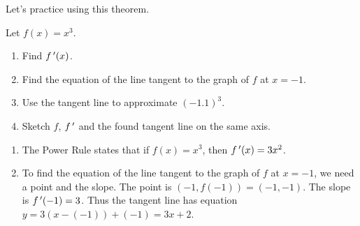 
Let's practice using this theorem.

\begin{example}\label{ex_deriv_rule1}%
Let $f(x)=x^3$. 
\begin{enumerate}
	\item	Find $f\,'(x)$.
	\item	Find the equation of the line tangent to the graph of $f$ at $x=-1$. 
	\item	Use the tangent line to approximate $(-1.1)^3$.
	\item	Sketch $f$, $f\,'$ and the found tangent line on the same axis.
\end{enumerate}
\solution
\begin{enumerate}
	\item	The Power Rule states that if $f(x) = x^3$, then $f\,'(x) = 3x^2$. 
	\item	To find the equation of the line tangent to the graph of $f$ at $x=-1$, we need a point and the slope. The point is $(-1,f(-1)) = (-1, -1)$. The slope is $f\,'(-1)= 3$. Thus the tangent line has equation $y = 3(x-(-1))+(-1) = 3x+2$. 


\end{enumerate}
\end{example}
